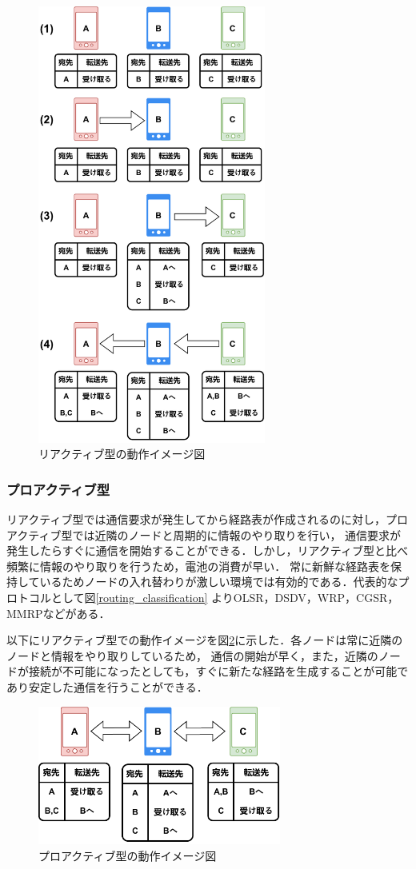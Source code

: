 \documentclass[a4paper, 11pt]{ltjsarticle}
\begin{document}
\begin{figure}[H]
  \centering
  \includegraphics[width=75mm]{reactive_model.pdf}
  \caption{リアクティブ型の動作イメージ図}
  \label{reactive}
\end{figure}

\clearpage
\subsubsection{プロアクティブ型}
リアクティブ型では通信要求が発生してから経路表が作成されるのに対し，プロアクティブ型では近隣のノードと周期的に情報のやり取りを行い，
通信要求が発生したらすぐに通信を開始することができる．しかし，リアクティブ型と比べ頻繁に情報のやり取りを行うため，電池の消費が早い．
常に新鮮な経路表を保持しているためノードの入れ替わりが激しい環境では有効的である．代表的なプロトコルとして図\ref{routing_classification}
よりOLSR，DSDV，WRP，CGSR，MMRPなどがある．

以下にリアクティブ型での動作イメージを図\ref{proactive}に示した．各ノードは常に近隣のノードと情報をやり取りしているため，
通信の開始が早く，また，近隣のノードが接続が不可能になったとしても，すぐに新たな経路を生成することが可能であり安定した通信を行うことができる．
\begin{figure}[H]
  \centering
  \includegraphics[width=80mm]{proactive_model.pdf}
  \caption{プロアクティブ型の動作イメージ図}
  \label{proactive}
\end{figure}
\end{document}
